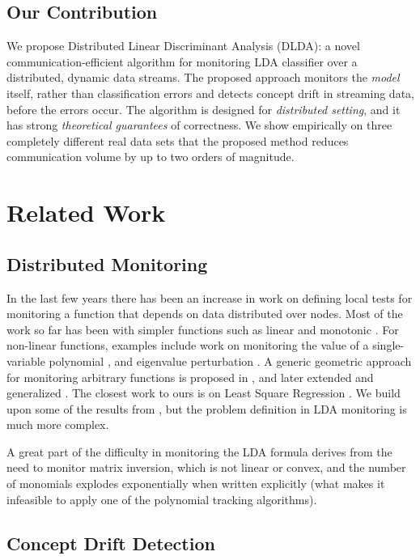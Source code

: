 \documentclass{sig-alternate-05-2015}
\begin{document}
\subsection{Our Contribution}
We propose Distributed Linear Discriminant Analysis (DLDA): a novel
communication-efficient algorithm for monitoring LDA classifier over a distributed, dynamic data streams.
The proposed approach monitors the {\em model} itself, rather than classification errors 
and detects concept drift in streaming data, before the errors occur. 
The algorithm is designed for {\em distributed setting}, and it has strong 
{\em theoretical guarantees} of correctness. 
We show empirically on three completely different real data sets that the proposed 
method reduces communication volume by up to two orders of magnitude.


\section{Related Work}
\subsection{Distributed Monitoring}
In the last few years there has been an increase in work on defining local tests 
for monitoring a function that depends on data distributed over nodes.
Most of the work so far has been with simpler functions such as linear
\cite{keralapura2006communication, kashyap2008efficient} and monotonic \cite{michel2005klee}.
For non-linear functions, examples include work on monitoring
the value of a single-variable polynomial \cite{shah2008handling}, 
and eigenvalue perturbation \cite{huang2007communication}. 
A generic geometric approach for monitoring arbitrary functions is proposed in
\cite{sharfman2007geometric}, and later extended and generalized
\cite{keren2012shape,lazerson2015monitoring}. 
The closest work to ours is on Least Square Regression
\cite{gabel2015monitoring}. We build upon some of the results from
\cite{gabel2015monitoring}, but the problem definition in LDA monitoring is much
more complex.

A great part of the difficulty in monitoring the LDA formula derives from the
need to monitor matrix inversion, which is not linear or convex,
and the number of monomials explodes exponentially when written explicitly
(what makes it infeasible to apply one of the polynomial tracking
algorithms).
\subsection{Concept Drift Detection}
\end{document}
